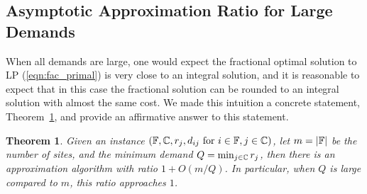 \documentclass[oneside,final]{ucr}
\newtheorem{theorem}{Theorem}
\begin{document}
\subsection{Asymptotic Approximation Ratio for Large
  Demands}
When all demands are large, one would expect the fractional
optimal solution to LP (\ref{eqn:fac_primal}) is very close
to an integral solution, and it is reasonable to expect that
in this case the fractional solution can be rounded to an
integral solution with almost the same cost. We made this
intuition a concrete statement, Theorem~\ref{thm:largeR},
and provide an affirmative answer to this statement.

\begin{theorem}
  \label{thm:largeR}
  Given an {\FTFP} instance $(\mathbb{F}, \mathbb{C}, r_j,
  d_{ij} \text{ for } i\in\mathbb{F}, j\in\mathbb{C})$, let
  $m = |\mathbb{F}|$ be the number of sites, and the minimum
  demand $Q = \min_{j\in\mathbb{C}} r_j$, then there is an
  approximation algorithm with ratio $1 + O(m/Q)$. In
  particular, when $Q$ is large compared to $m$, this ratio
  approaches $1$.
\end{theorem}
\end{document}

